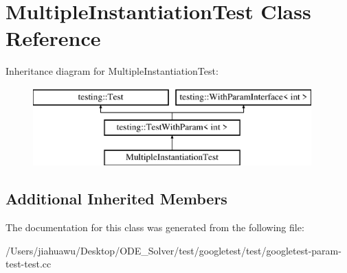 \hypertarget{class_multiple_instantiation_test}{}\section{Multiple\+Instantiation\+Test Class Reference}
\label{class_multiple_instantiation_test}
Inheritance diagram for Multiple\+Instantiation\+Test\+:\begin{figure}[H]
\begin{center}
\leavevmode
\includegraphics[height=3.000000cm]{class_multiple_instantiation_test}
\end{center}
\end{figure}
\subsection*{Additional Inherited Members}


The documentation for this class was generated from the following file\+:\begin{DoxyCompactItemize}
\item 
/\+Users/jiahuawu/\+Desktop/\+O\+D\+E\+\_\+\+Solver/test/googletest/test/googletest-\/param-\/test-\/test.\+cc\end{DoxyCompactItemize}
